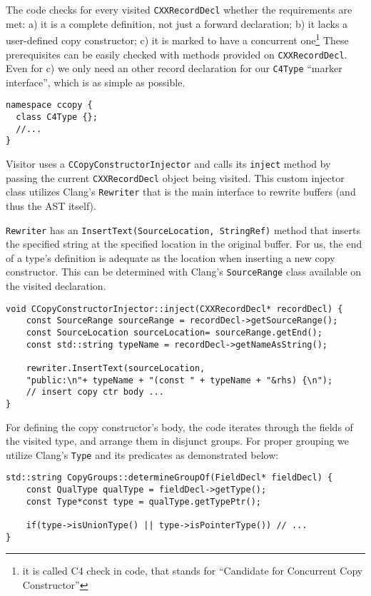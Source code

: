 \documentclass{article}
\begin{document}
The code checks for every visited \texttt{CXXRecordDecl} whether the requirements are met: a) it is a complete definition, not just a forward declaration; b) it lacks a user-defined copy constructor; c) it is marked to have a concurrent one\footnote{it is called C4 check in code, that stands for ``Candidate for Concurrent Copy Constructor''}
These prerequisites can be easily checked with methods provided on \texttt{CXXRecordDecl}. Even for c) we only need an other record declaration for our \texttt{C4Type} ``marker interface'', which is as simple as possible.

\begin{verbatim}
namespace ccopy {
  class C4Type {};
  //...
}
\end{verbatim}

Visitor uses a \texttt{CCopyConstructorInjector} and calls its \texttt{inject} method by passing the current \texttt{CXXRecordDecl} object being visited. This custom injector class utilizes Clang's \texttt{Rewriter} that is the main interface to rewrite buffers (and thus the AST itself). 

\texttt{Rewriter} has an \texttt{InsertText(SourceLocation, StringRef)} method that inserts the specified string at the specified location in the original buffer. For us, the end of a type's definition is adequate as the location when inserting a new copy constructor. This can be determined with Clang's \texttt{SourceRange} class available on the visited declaration.

\begin{verbatim}
void CCopyConstructorInjector::inject(CXXRecordDecl* recordDecl) {
    const SourceRange sourceRange = recordDecl->getSourceRange();
    const SourceLocation sourceLocation= sourceRange.getEnd();
    const std::string typeName = recordDecl->getNameAsString();    
    
    rewriter.InsertText(sourceLocation,
    "public:\n"+ typeName + "(const " + typeName + "&rhs) {\n");
    // insert copy ctr body ...
}
\end{verbatim}

For defining the copy constructor's body, the code iterates through the fields of the visited type, and arrange them in disjunct groups. For proper grouping we utilize Clang's \texttt{Type} and its predicates as demonstrated below:

\begin{verbatim}
std::string CopyGroups::determineGroupOf(FieldDecl* fieldDecl) {
    const QualType qualType = fieldDecl->getType();
    const Type*const type = qualType.getTypePtr();
    
    if(type->isUnionType() || type->isPointerType()) // ...
}
\end{verbatim}
\end{document}
